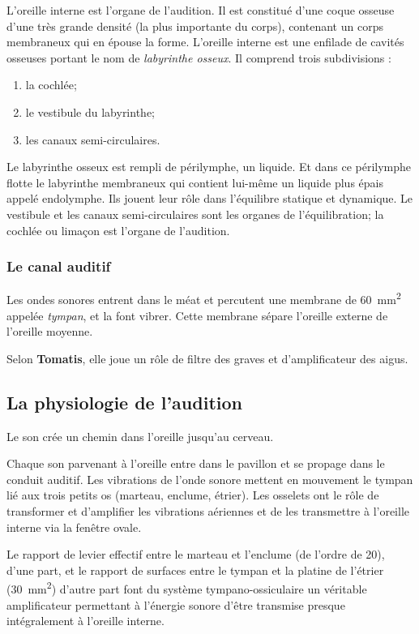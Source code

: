 L'oreille interne est l'organe de l'audition. Il
est constitué d'une coque osseuse d'une très grande densité (la plus
importante du corps), contenant un corps membraneux qui en épouse
la forme. 
L'oreille interne est une enfilade de cavités osseuses portant 
le nom de \emph{labyrinthe osseux}. Il comprend trois subdivisions : 
\begin{enumerate}
	\item la cochlée;
	\item le vestibule du labyrinthe;
	\item  les canaux semi-circulaires.
\end{enumerate}

Le labyrinthe
osseux est rempli de périlymphe, un liquide. Et dans ce périlymphe
flotte le labyrinthe membraneux qui contient lui-même un liquide
plus épais appelé endolymphe. Ils jouent leur rôle dans l'équilibre
statique et dynamique. Le vestibule et les canaux semi-circulaires
sont les organes de l'équilibration; la cochlée ou
limaçon est l'organe de l'audition. 

\subsubsection{Le canal auditif}
Les ondes sonores entrent dans le méat et percutent
une membrane de \SI{60}{\milli\metre\squared} appelée \emph{tympan}, et la font vibrer. Cette membrane
sépare l'oreille externe de l'oreille moyenne.


Selon \textbf{Tomatis}, elle
joue un rôle de filtre des graves et d'amplificateur des aigus.



\subsection{La physiologie de l'audition}

Le  son crée un chemin dans 
l'oreille\autocite[chap. 8, pp. 322--324]{marieb:biologie} jusqu'au cerveau.

Chaque son parvenant à l'oreille entre dans le pavillon et se propage
dans le conduit auditif. Les vibrations de l'onde sonore mettent en
mouvement le tympan lié aux trois petits os (marteau, enclume, étrier).
Les osselets ont le rôle de transformer et d'amplifier les vibrations
aériennes et de les transmettre à l'oreille interne via la fenêtre
ovale.

Le rapport de levier effectif entre le marteau et l'enclume
(de l'ordre de 20), d'une part, et le
rapport de surfaces entre le tympan et la platine de l'étrier
(\SI{30}{\milli\metre\squared}) d\textquoteright autre part font du système tympano-ossiculaire
un véritable amplificateur permettant à l\textquoteright énergie sonore
d\textquoteright être transmise presque intégralement à l\textquoteright oreille
interne.

